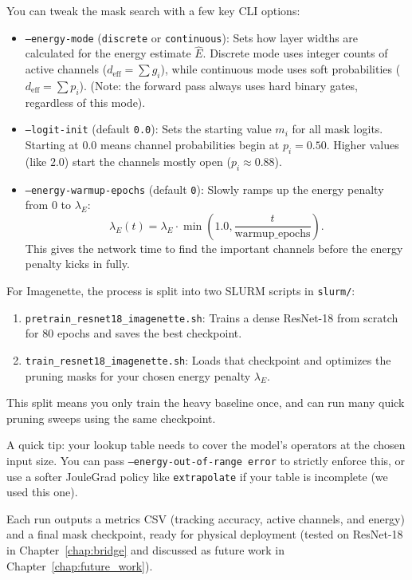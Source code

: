 You can tweak the mask search with a few key CLI options:
\begin{itemize}
    \item \texttt{--energy-mode} (\texttt{discrete} or \texttt{continuous}):
    Sets how layer widths are calculated for the energy estimate $\widehat{E}$.
    Discrete mode uses integer counts of active channels ($d_{\text{eff}} = \sum g_i$), while continuous mode uses soft probabilities ($d_{\text{eff}} = \sum p_i$).
    (Note: the forward pass always uses hard binary gates, regardless of this mode).
    \item \texttt{--logit-init} (default \texttt{0.0}):
    Sets the starting value $m_i$ for all mask logits. Starting at $0.0$ means channel probabilities begin at $p_i = 0.50$. Higher values (like $2.0$) start the channels mostly open ($p_i \approx 0.88$).
    \item \texttt{--energy-warmup-epochs} (default \texttt{0}):
    Slowly ramps up the energy penalty from 0 to $\lambda_E$:
    $$
    \lambda_E(t) = \lambda_E \cdot \min\left(1.0, \frac{t}{\text{warmup\_epochs}}\right).
    $$
    This gives the network time to find the important channels before the energy penalty kicks in fully.
\end{itemize}

For Imagenette, the process is split into two SLURM scripts in \texttt{slurm/}:
\begin{enumerate}
    \item \texttt{pretrain\_resnet18\_imagenette.sh}: Trains a dense ResNet-18 from scratch for 80 epochs and saves the best checkpoint.
    \item \texttt{train\_resnet18\_imagenette.sh}: Loads that checkpoint and optimizes the pruning masks for your chosen energy penalty $\lambda_E$.
\end{enumerate}
This split means you only train the heavy baseline once, and can run many quick pruning sweeps using the same checkpoint.

A quick tip: your lookup table needs to cover the model's operators at the chosen input size. You can pass \texttt{--energy-out-of-range error} to strictly enforce this, or use a softer JouleGrad policy like \texttt{extrapolate} if your table is incomplete (we used this one).

Each run outputs a metrics CSV (tracking accuracy, active channels, and energy) and a final mask checkpoint, ready for physical deployment (tested on ResNet-18 in Chapter~\ref{chap:bridge} and discussed as future work in Chapter~\ref{chap:future_work}).

